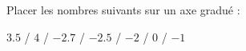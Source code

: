 
\begin{exercice}\label{exo2smath-0139}

    Placer les nombres suivants sur un axe gradué :
    \begin{center}
    \( 3.5\) / \( 4\) / \( -2.7\) / \( -2.5\) / \( -2\) / \( 0\) / $-1$
    \end{center}

\end{exercice}
